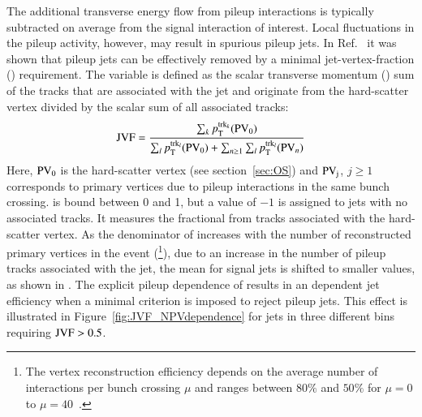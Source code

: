 \documentclass{atlasnote}
\begin{document}
The additional transverse energy flow from pileup interactions 
is typically subtracted on average from the signal interaction of interest. 
Local fluctuations in the pileup activity, however, 
may result in spurious pileup jets.
In Ref.~\cite{ATLASConfNote:PUcorrection} it was shown that pileup jets can be 
effectively removed by a minimal jet-vertex-fraction (\JVF) requirement. 
The \JVF variable is defined as the scalar transverse momentum (\pT) 
sum of the tracks that are associated with the jet and originate from the hard-scatter vertex divided by the scalar \pT sum of all associated tracks:
\begin{equation}
{\rm JVF} = \frac{\sum_k{p_{\mathrm{T}}^{{\rm trk}_k}({\rm PV}_0)}}{\sum_l p_{\mathrm{T}}^{{\rm trk}_l}({\rm PV}_0) + \sum_{n\geq1}\sum_l p_{\mathrm{T}}^{{\rm trk}_l}({\rm PV}_n)} 
\label{eq:JVF}
\end{equation}
Here, $\rm PV_0$ is the hard-scatter vertex (see section~\ref{sec:OS}) and $\rm PV_j$, $j\geq1$ corresponds to primary vertices due to pileup interactions in the same bunch crossing. 
\JVF is bound between 0 and 1, but a value of $-1$ is assigned to jets with no associated tracks. 
It measures the fractional \pT from tracks associated with the hard-scatter vertex. 
As the denominator of \JVF increases with the number of reconstructed primary vertices in the event 
(\NPV\footnote{%
The vertex reconstruction efficiency depends on the average number of interactions per bunch crossing $\mu$ and ranges between $80\%$ 
and $50\%$ for $\mu = 0$ to $\mu = 40$~\cite{ATLAS-CONF-2012-042}.}), due to an increase in the number of pileup tracks associated with the jet, 
the mean \JVF for signal jets is shifted to smaller values, as shown in .
The explicit pileup dependence of \JVF results in an \NPV dependent jet efficiency when a minimal \JVF criterion is 
imposed to reject pileup jets. This effect is illustrated in Figure~\ref{fig:JVF_NPVdependence} for jets in three different \pT bins requiring ${\rm JVF} > 0.5$. 
\end{document}
